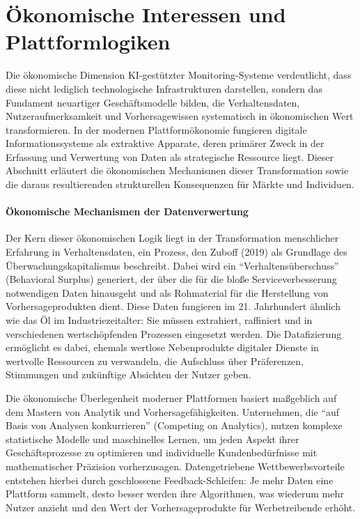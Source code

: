\section{Ökonomische Interessen und Plattformlogiken}

Die ökonomische Dimension \ac{KI}-gestützter Monitoring-Systeme verdeutlicht, dass diese nicht lediglich technologische Infrastrukturen darstellen, sondern das Fundament neuartiger Geschäftsmodelle bilden, die Verhaltensdaten, Nutzeraufmerksamkeit und Vorhersagewissen systematisch in ökonomischen Wert transformieren. In der modernen Plattformökonomie fungieren digitale Informationssysteme als extraktive Apparate, deren primärer Zweck in der Erfassung und Verwertung von Daten als strategische Ressource liegt. Dieser Abschnitt erläutert die ökonomischen Mechanismen dieser Transformation sowie die daraus resultierenden strukturellen Konsequenzen für Märkte und Individuen.

\paragraph{Ökonomische Mechanismen der Datenverwertung}

Der Kern dieser ökonomischen Logik liegt in der Transformation menschlicher Erfahrung in Verhaltensdaten, ein Prozess, den Zuboff (2019) als Grundlage des Überwachungskapitalismus beschreibt. Dabei wird ein \enquote{Verhaltensüberschuss} (Behavioral Surplus) generiert, der über die für die bloße Serviceverbesserung notwendigen Daten hinausgeht und als Rohmaterial für die Herstellung von Vorhersageprodukten dient. Diese Daten fungieren im 21. Jahrhundert ähnlich wie das Öl im Industriezeitalter: Sie müssen extrahiert, raffiniert und in verschiedenen wertschöpfenden Prozessen eingesetzt werden. Die Datafizierung ermöglicht es dabei, ehemals wertlose Nebenprodukte digitaler Dienste in wertvolle Ressourcen zu verwandeln, die Aufschluss über Präferenzen, Stimmungen und zukünftige Absichten der Nutzer geben.

Die ökonomische Überlegenheit moderner Plattformen basiert maßgeblich auf dem Mastern von Analytik und Vorhersagefähigkeiten. Unternehmen, die \enquote{auf Basis von Analysen konkurrieren} (Competing on Analytics), nutzen komplexe statistische Modelle und maschinelles Lernen, um jeden Aspekt ihrer Geschäftsprozesse zu optimieren und individuelle Kundenbedürfnisse mit mathematischer Präzision vorherzusagen. Datengetriebene Wettbewerbsvorteile entstehen hierbei durch geschlossene Feedback-Schleifen: Je mehr Daten eine Plattform sammelt, desto besser werden ihre Algorithmen, was wiederum mehr Nutzer anzieht und den Wert der Vorhersageprodukte für Werbetreibende erhöht.


